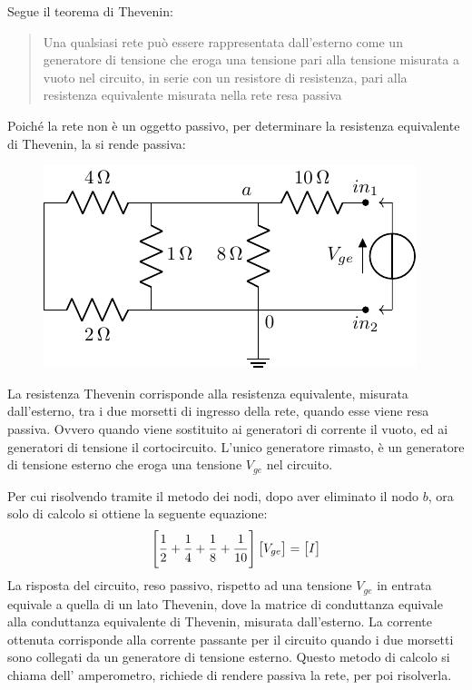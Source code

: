 \documentclass{article}
\numberwithin{equation}{subsection}
\begin{document}
Segue il teorema di Thevenin:
\begin{quotation}
    Una qualsiasi rete può essere rappresentata dall'esterno come un generatore di tensione che eroga una tensione pari alla tensione misurata a vuoto nel circuito, in serie 
    con un resistore di resistenza, pari alla resistenza equivalente misurata nella rete resa passiva
\end{quotation}
Poiché la rete non è un oggetto passivo, per determinare la resistenza equivalente di Thevenin, la si rende passiva: 
\begin{figure}[H]%
    \centering
    \includegraphics{resistenza-equivalente-circuito-8.pdf}%
    \label{fig:resistenza-equivalente-circuito-8}
\end{figure}
La resistenza Thevenin corrisponde alla resistenza equivalente, misurata dall'esterno, tra i due 
morsetti di ingresso della rete, quando esse viene resa passiva. Ovvero quando viene sostituito ai generatori di corrente il vuoto, ed ai generatori di tensione il 
cortocircuito. L'unico generatore rimasto, è un generatore di tensione esterno che eroga una tensione $V_{ge}$ nel circuito. 

Per cui risolvendo tramite il metodo dei nodi, dopo aver eliminato il nodo $b$, ora solo di calcolo si ottiene la seguente equazione:
\begin{gather*}
    \begin{bmatrix}
        \displaystyle\frac{\strut 1}{\strut 2}+\frac{\strut 1}{\strut 4}+\frac{\strut 1}{\strut 8}+\frac{\strut 1}{\strut 10}
    \end{bmatrix}\begin{bmatrix}
        V_{ge}
    \end{bmatrix}=\begin{bmatrix}
        I
    \end{bmatrix}
\end{gather*}
La risposta del circuito, reso passivo, 
rispetto ad una tensione $V_{ge}$ in entrata equivale a quella di un lato Thevenin, dove la matrice di conduttanza equivale alla conduttanza equivalente di 
Thevenin, misurata dall'esterno. La corrente ottenuta 
corrisponde alla corrente passante per il circuito quando i due morsetti sono collegati da un generatore di tensione esterno. Questo metodo di calcolo si chiama dell'
amperometro, richiede di rendere passiva la rete, per poi risolverla.  
\end{document}
